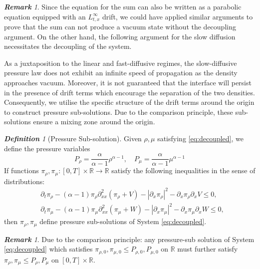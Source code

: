 \documentclass[a4paper,twosided, 11pt]{article}
\newcommand{\R}{\mathbb{R}}
\theoremstyle{plain}
\theoremstyle{remark}
\newtheorem{remark}[thm]{\bf Remark}
\newtheorem{definition}[thm]{\bf Definition}
\numberwithin{equation}{section}
\begin{document}
\begin{remark}
    Since the equation for the sum can also be written as a parabolic equation equipped with an $L^\infty_{t,x}$ drift, we could have applied similar arguments to prove that the sum can not produce a vacuum state without the decoupling argument. 
    On the other hand, the following argument for the slow diffusion necessitates the decoupling of the system.
\end{remark}
As a juxtaposition to the linear and fast-diffusive regimes, the slow-diffusive pressure law does not exhibit an infinite speed of propagation as the density approaches vacuum. 
Moreover, it is not guaranteed that the interface will persist in the presence of drift terms which encourage the separation of the two densities. 
Consequently, we utilise the specific structure of the drift terms around the origin to construct pressure sub-solutions.
Due to the comparison principle, these sub-solutions ensure a mixing zone around the origin.
\begin{definition}[Pressure Sub-solution]
    Given $\rho, \mu$ satisfying \eqref{eq:decoupled}, we define the pressure variables 
    \[
    P_\rho = \frac{\alpha}{\alpha-1}\rho^{\alpha-1}, \quad P_\mu = \frac{\alpha}{\alpha-1}\mu^{\alpha-1}
    \] 
    If functions $\pi_\rho,\pi_\mu \colon [0,T] \times \R \to \R$ satisfy the following inequalities in the sense of distributions:
\begin{align} 
& \partial_t \pi_\rho - (\alpha-1)\pi_\rho \partial_{xx}^2(\pi_\rho+V) - |\partial_x \pi_\rho|^2 - \partial_x \pi_\rho \partial_x V \leq 0,\label{eq:subsolutionrho}\\
& \partial_t \pi_\mu - (\alpha-1)\pi_\mu \partial_{xx}^2(\pi_\mu+W) - |\partial_x \pi_\mu|^2 - \partial_x \pi_\mu \partial_x W \leq 0,\label{eq:subsolutionmu}
\end{align}
then $\pi_\rho,\pi_\mu$ define pressure sub-solutions of System \eqref{eq:decoupled}.
\end{definition}
\begin{remark}\label{rmk:comparison}
Due to the comparison principle: \cite[Theorem 3.4]{KimZhang18} any pressure-sub solution of System \eqref{eq:decoupled} which satisfies $\pi_{\rho,0},\pi_{\mu,0} \leq P_{\rho,0}, P_{\mu,0}$ on $\R$ must further satisfy $\pi_{\rho},\pi_{\mu} \leq P_{\rho}, P_{\mu}$ on $[0,T] \times \R$.
\end{remark}

\iffalse
\end{document}
